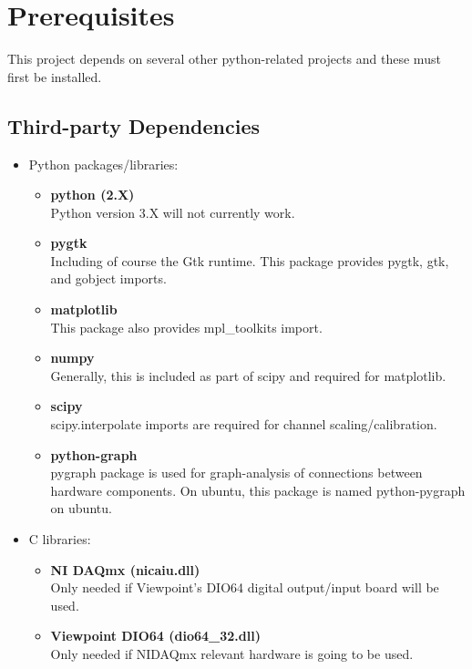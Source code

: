 
\section{Prerequisites}

This project depends on several other python-related projects and these must
first be installed.

\subsection{Third-party Dependencies}
\begin{itemize}
  \item Python packages/libraries:
    \begin{itemize}
    \item \textbf{python (2.X)} \\
      Python version 3.X will not currently work.
    \item \textbf{pygtk} \\
      Including of course the Gtk runtime.
      This package provides pygtk, gtk, and gobject imports.
    \item \textbf{matplotlib} \\
      This package also provides mpl\_toolkits import.
    \item \textbf{numpy} \\
      Generally, this is included as part of scipy and required for matplotlib.
    \item \textbf{scipy} \\
      scipy.interpolate imports are required for channel scaling/calibration.
    \item \textbf{python-graph} \\
      pygraph package is used for graph-analysis of connections between hardware
      components.
      On ubuntu, this package is named python-pygraph on ubuntu.
    \end{itemize}
  \item C libraries:
    \begin{itemize}
    \item \textbf{NI DAQmx (nicaiu.dll)} \\
      Only needed if Viewpoint's DIO64 digital output/input board will be used.
    \item \textbf{Viewpoint DIO64 (dio64\_32.dll)} \\
      Only needed if NIDAQmx relevant hardware is going to be used.
    \end{itemize}
\end{itemize}

